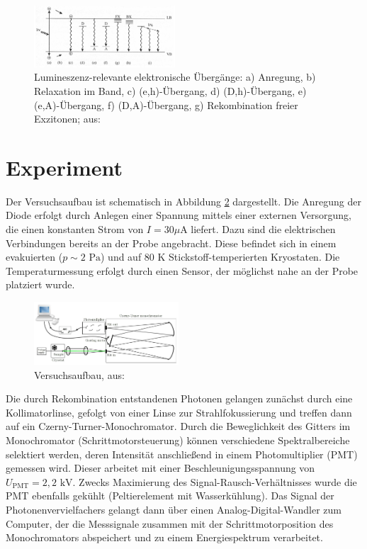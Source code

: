 \documentclass[aps,twocolumn,secnumarabic,nobalancelastpage,amsmath,amssymb,
nofootinbib,superscriptaddress]{revtex4-1}
\begin{document}
\begin{figure}[h!]
  \centering
  \includegraphics[width=0.47\textwidth]{img/rekombinationswege.jpg}
  \caption{ Lumineszenz-relevante elektronische Übergänge: a) Anregung, b) Relaxation im Band,
  c) (e,h)-Übergang, d) (D,h)-Übergang, e) (e,A)-Übergang, f) (D,A)-Übergang, g) Rekombination freier Exzitonen; aus: \cite{saarland}}
  \label{fig:rekomb}
\end{figure}



\section{Experiment}

\noindent Der Versuchsaufbau ist schematisch in Abbildung \ref{fig:versuch} dargestellt. Die Anregung der Diode erfolgt durch Anlegen einer
Spannung mittels einer externen Versorgung, die einen konstanten Strom von $I=30\text{$\mu$A}$ liefert. Dazu sind die elektrischen Verbindungen bereits an der Probe angebracht.
Diese befindet sich in einem evakuierten ($p\sim 2\text{ Pa}$) und auf $80\text{ K}$ Stickstoff-temperierten Kryostaten. Die Temperaturmessung
erfolgt durch einen Sensor, der möglichst nahe an der Probe platziert wurde.

\begin{figure}[h]
  \centering
  \includegraphics[width=0.48\textwidth]{img/versuchsanleitung.jpg}
  \caption{Versuchsaufbau, aus: \cite{anleitung}}
  \label{fig:versuch}
\end{figure}

\noindent Die durch Rekombination entstandenen Photonen gelangen zunächst durch eine Kollimatorlinse, gefolgt von einer Linse zur
Strahlfokussierung und treffen dann auf ein Czerny-Turner-Monochromator. Durch die Beweglichkeit des Gitters im
Monochromator (Schrittmotorsteuerung) können verschiedene Spektralbereiche selektiert werden, deren Intensität anschließend in einem Photomultiplier (PMT)
gemessen wird. Dieser arbeitet mit einer Beschleunigungsspannung von $U_\text{PMT}=2,2\text{ kV}$. Zwecks Maximierung des
Signal-Rausch-Verhältnisses wurde die PMT ebenfalls gekühlt (Peltierelement mit Wasserkühlung). Das Signal der Photonenvervielfachers
gelangt dann über einen Analog-Digital-Wandler zum Computer, der die Messsignale zusammen mit der Schrittmotorposition des Monochromators
abspeichert und zu einem Energiespektrum verarbeitet.\newpage
\end{document}
